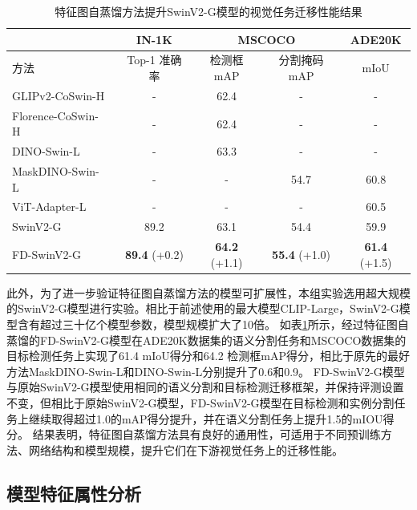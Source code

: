 \begin{table}
\caption{
特征图自蒸馏方法提升SwinV2-G模型的视觉任务迁移性能结果}
\centering
  \begin{tabular}{lcccc}
  
\toprule

   &  IN-1K & \multicolumn{2}{c}{MSCOCO}  & ADE20K  \\
  \midrule
  方法 &Top-1 准确率 & 检测框mAP & 分割掩码mAP & mIoU \\
  \midrule
  GLIPv2-CoSwin-H~\cite{GLIPv2_2022} & - & 62.4 & - & - \\
  Florence-CoSwin-H~\cite{yuan2021florence} & - & 62.4 & - & -  \\
  DINO-Swin-L~\cite{zhang2022dino} & - & 63.3 & - & - \\
  MaskDINO-Swin-L~\cite{li2022mask} & - & - & 54.7 & 60.8 \\
  ViT-Adapter-L~\cite{chen2022vitadapter} & - & - & - & 60.5 \\
    
\midrule
  SwinV2-G & 89.2 & 63.1 & 54.4 & 59.9 \\
  FD-SwinV2-G & \textbf{89.4}\scriptsize{ (+0.2)} & \textbf{64.2}\scriptsize{ (+1.1)} & \textbf{55.4}\scriptsize{ (+1.0)} & \textbf{61.4}\scriptsize{ (+1.5)} \\
%      
  
\bottomrule
  \end{tabular}
\label{tab:fd-swinv2_G}
\end{table}

此外，为了进一步验证特征图自蒸馏方法的模型可扩展性，本组实验选用超大规模的SwinV2-G\cite{swinv2cvpr}模型进行实验。相比于前述使用的最大模型CLIP-Large，SwinV2-G模型含有超过三十亿个模型参数，模型规模扩大了10倍。
如表\ref{tab:fd-swinv2_G}所示，经过特征图自蒸馏的FD-SwinV2-G模型在ADE20K数据集的语义分割任务和MSCOCO数据集的目标检测任务上实现了61.4 mIoU得分和64.2 检测框mAP得分，相比于原先的最好方法MaskDINO-Swin-L和DINO-Swin-L\cite{zhang2022dino,li2022mask}分别提升了0.6和0.9。
FD-SwinV2-G模型与原始SwinV2-G模型使用相同的语义分割和目标检测迁移框架\cite{xiao2018upernet, chen2019htc}，并保持评测设置不变，但相比于原始SwinV2-G模型，FD-SwinV2-G模型在目标检测和实例分割任务上继续取得超过1.0的mAP得分提升，并在语义分割任务上提升1.5的mIOU得分。
结果表明，特征图自蒸馏方法具有良好的通用性，可适用于不同预训练方法、网络结构和模型规模，提升它们在下游视觉任务上的迁移性能。


\subsection{模型特征属性分析}
\label{sec:fd-analysis}


